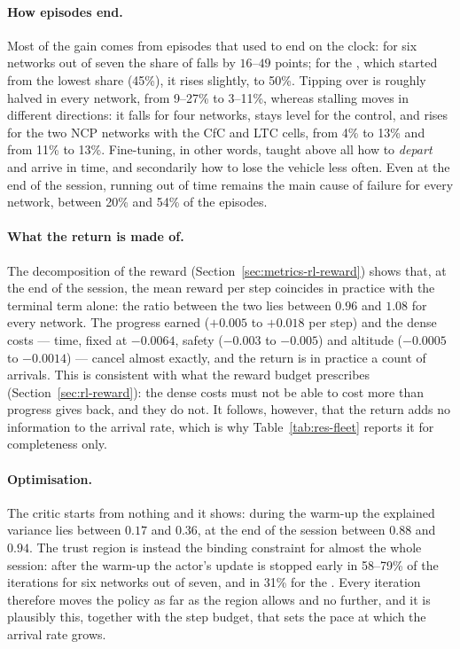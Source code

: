 \paragraph{How episodes end.}
Most of the gain comes from episodes that used to end on the clock: for six
networks out of seven the share of  falls by $16$--$49$ points;
for the , which started from the lowest share (45\%), it
rises slightly, to 50\%. Tipping over is roughly halved in every network, from
9--27\% to 3--11\%, whereas stalling moves in different directions: it falls
for four networks, stays level for the control, and rises for the two NCP
networks with the CfC and LTC cells, from 4\% to 13\% and from 11\% to 13\%.
Fine-tuning, in other words, taught above all how to \emph{depart} and arrive
in time, and secondarily how to lose the vehicle less often. Even at the end of
the session, running out of time remains the main cause of failure for every
network, between 20\% and 54\% of the episodes.

\paragraph{What the return is made of.}
The decomposition of the reward (Section~\ref{sec:metrics-rl-reward}) shows
that, at the end of the session, the mean reward per step coincides in practice
with the terminal term alone: the ratio between the two lies between $0.96$
and $1.08$ for every network. The progress earned ($+0.005$ to $+0.018$ per
step) and the dense costs --- time, fixed at $-0.0064$, safety ($-0.003$ to
$-0.005$) and altitude ($-0.0005$ to $-0.0014$) --- cancel almost exactly, and
the return is in practice a count of arrivals. This is consistent with what the
reward budget prescribes (Section~\ref{sec:rl-reward}): the dense costs must not
be able to cost more than progress gives back, and they do not. It follows,
however, that the return adds no information to the arrival rate, which is why
Table~\ref{tab:res-fleet} reports it for completeness only.

\paragraph{Optimisation.}
The critic starts from nothing and it shows: during the warm-up the explained
variance lies between $0.17$ and $0.36$, at the end of the session between
$0.88$ and $0.94$. The trust region is instead the binding constraint for
almost the whole session: after the warm-up the actor's update is stopped early
in 58--79\% of the iterations for six networks out of seven, and in 31\% for
the . Every iteration therefore moves the policy as far as
the region allows and no further, and it is plausibly this, together with the
step budget, that sets the pace at which the arrival rate grows.

